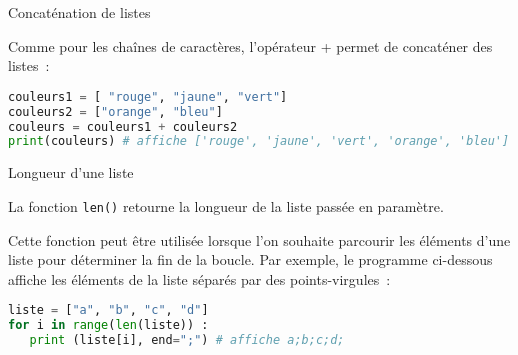 \begin{h3} Concaténation de listes \end{h3}
Comme pour les chaînes de caractères, l'opérateur \og + \fg{} permet de concaténer des listes~:
\begin{lstlisting}[language=Python]
couleurs1 = [ "rouge", "jaune", "vert"]
couleurs2 = ["orange", "bleu"]
couleurs = couleurs1 + couleurs2
print(couleurs) # affiche ['rouge', 'jaune', 'vert', 'orange', 'bleu']
\end{lstlisting}
\begin{h3} Longueur d'une liste \end{h3}
La fonction \texttt{len()} retourne la longueur de la liste passée en paramètre.
\par
Cette fonction peut être utilisée lorsque l'on souhaite parcourir les éléments d'une liste pour déterminer la fin de la boucle. Par exemple, le programme ci-dessous affiche les éléments de la liste séparés par des points-virgules~:
\begin{lstlisting}[language=Python]
liste = ["a", "b", "c", "d"]
for i in range(len(liste)) :
   print (liste[i], end=";") # affiche a;b;c;d;
\end{lstlisting}
